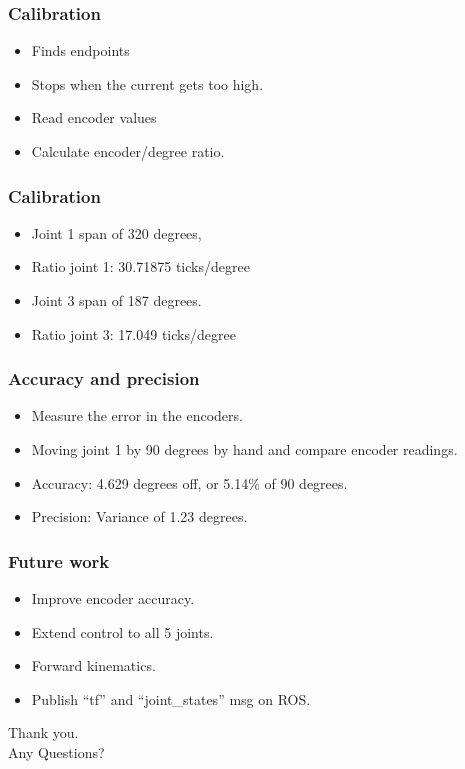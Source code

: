 \documentclass{beamer}
\begin{document}
  \begin{frame}
	\frametitle{Calibration}
	  \begin{itemize}
      	\item Finds endpoints
      	\item Stops when the current gets too high.
      	\item Read encoder values
      	\item Calculate encoder/degree ratio.
      \end{itemize}
  \end{frame}
  
    \begin{frame}
	\frametitle{Calibration}
	  \begin{itemize}
      	\item Joint 1 span of 320 degrees, 
      	\item Ratio joint 1: 30.71875 ticks/degree
      	\item Joint 3 span of 187 degrees.
      	\item Ratio joint 3: 17.049 ticks/degree
      \end{itemize}
  \end{frame}
    
  \begin{frame}
    \frametitle{Accuracy and precision}
    \begin{itemize}
      \item Measure the error in the encoders.
      \item Moving joint 1 by 90 degrees by hand and compare encoder readings.
      \item Accuracy: 4.629 degrees off, or 5.14\% of 90 degrees.
      \item Precision: Variance of 1.23 degrees.
	\end{itemize}
  \end{frame}
  
  \begin{frame}
    \frametitle{Future work}
    \begin{itemize}
    \item Improve encoder accuracy.
    \item Extend control to all 5 joints.
    \item Forward kinematics.
    \item Publish ``tf'' and ``joint\_states'' msg on ROS.
    \end{itemize}
  \end{frame}

  \begin{frame}
    \centering
    \huge
    Thank you. \\
    \vspace{0.5in}
     Any Questions?
  \end{frame}
\end{document}
